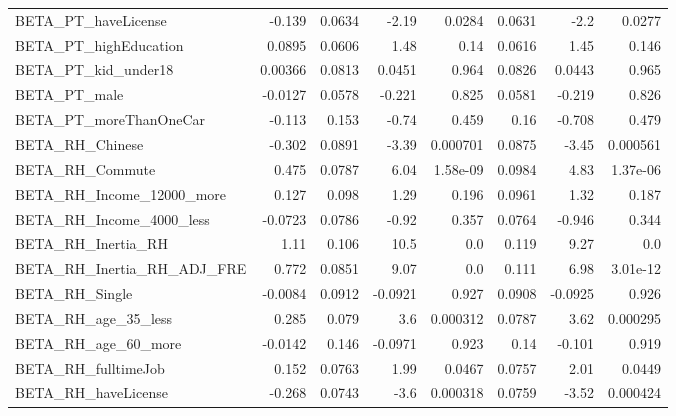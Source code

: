 \begin{tabular}{lrrrrrrr}
BETA\_PT\_haveLicense              &   -0.139 &   0.0634 &   -2.19 &   0.0284 &        0.0631 &         -2.2 &        0.0277 \\
BETA\_PT\_highEducation            &   0.0895 &   0.0606 &    1.48 &     0.14 &        0.0616 &         1.45 &         0.146 \\
BETA\_PT\_kid\_under18              &  0.00366 &   0.0813 &  0.0451 &    0.964 &        0.0826 &       0.0443 &         0.965 \\
BETA\_PT\_male                     &  -0.0127 &   0.0578 &  -0.221 &    0.825 &        0.0581 &       -0.219 &         0.826 \\
BETA\_PT\_moreThanOneCar           &   -0.113 &    0.153 &   -0.74 &    0.459 &          0.16 &       -0.708 &         0.479 \\
BETA\_RH\_Chinese                  &   -0.302 &   0.0891 &   -3.39 & 0.000701 &        0.0875 &        -3.45 &      0.000561 \\
BETA\_RH\_Commute                  &    0.475 &   0.0787 &    6.04 & 1.58e-09 &        0.0984 &         4.83 &      1.37e-06 \\
BETA\_RH\_Income\_12000\_more        &    0.127 &    0.098 &    1.29 &    0.196 &        0.0961 &         1.32 &         0.187 \\
BETA\_RH\_Income\_4000\_less         &  -0.0723 &   0.0786 &   -0.92 &    0.357 &        0.0764 &       -0.946 &         0.344 \\
BETA\_RH\_Inertia\_RH               &     1.11 &    0.106 &    10.5 &      0.0 &         0.119 &         9.27 &           0.0 \\
BETA\_RH\_Inertia\_RH\_ADJ\_FRE       &    0.772 &   0.0851 &    9.07 &      0.0 &         0.111 &         6.98 &      3.01e-12 \\
BETA\_RH\_Single                   &  -0.0084 &   0.0912 & -0.0921 &    0.927 &        0.0908 &      -0.0925 &         0.926 \\
BETA\_RH\_age\_35\_less              &    0.285 &    0.079 &     3.6 & 0.000312 &        0.0787 &         3.62 &      0.000295 \\
BETA\_RH\_age\_60\_more              &  -0.0142 &    0.146 & -0.0971 &    0.923 &          0.14 &       -0.101 &         0.919 \\
BETA\_RH\_fulltimeJob              &    0.152 &   0.0763 &    1.99 &   0.0467 &        0.0757 &         2.01 &        0.0449 \\
BETA\_RH\_haveLicense              &   -0.268 &   0.0743 &    -3.6 & 0.000318 &        0.0759 &        -3.52 &      0.000424 \\

\end{tabular}
